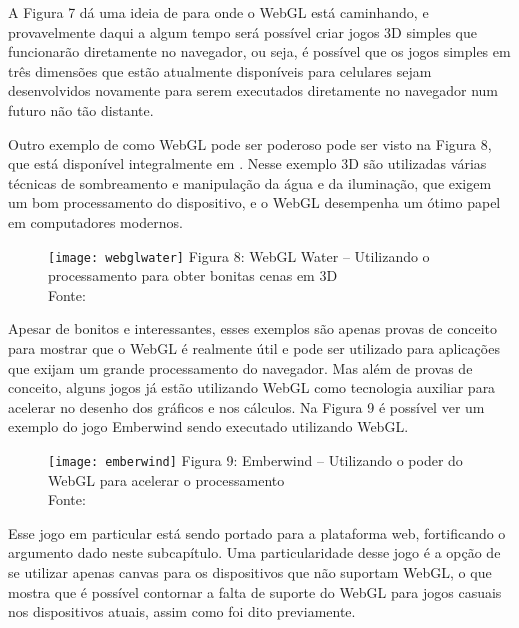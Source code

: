 A Figura 7 dá uma ideia de para onde o WebGL está
caminhando, e provavelmente daqui a algum tempo será possível criar
jogos 3D simples que funcionarão diretamente no navegador, ou seja,
é possível que os jogos simples em três dimensões que estão atualmente
disponíveis para celulares sejam desenvolvidos novamente para
serem executados diretamente no navegador num futuro não tão distante.

Outro exemplo de como WebGL pode ser poderoso pode ser visto na
Figura 8, que está disponível integralmente em .
Nesse exemplo 3D são utilizadas várias técnicas de sombreamento e
manipulação da água e da iluminação, que exigem um bom processamento
do dispositivo, e o WebGL desempenha um ótimo papel em computadores
modernos.

\begin{figure}[H]
  \centering
	\texttt{[image: webglwater]}
	\footnotesize\hspace{8\baselineskip}
	Figura 8: WebGL Water {--} Utilizando o processamento para obter bonitas cenas em 3D \\
	Fonte: \cite{website:webglwater}
  \label{img:webglwater}
\end{figure}

Apesar de bonitos e interessantes, esses exemplos são apenas provas de
conceito para mostrar que o WebGL é realmente útil e pode ser
utilizado para aplicações que exijam um grande processamento do
navegador. Mas além de provas de conceito, alguns jogos já estão
utilizando WebGL como tecnologia auxiliar para acelerar no desenho dos
gráficos e nos cálculos.
Na Figura 9 é possível ver um exemplo do jogo Emberwind
sendo executado utilizando WebGL.

\begin{figure}[H]
  \centering
	\texttt{[image: emberwind]}
	\footnotesize\hspace{8\baselineskip}
	Figura 9: Emberwind {--} Utilizando o poder do WebGL para acelerar o processamento \\
	Fonte: \cite{website:emberwind}
  \label{img:emberwind}
\end{figure}

Esse jogo em particular está sendo portado para a plataforma web,
fortificando o argumento dado neste subcapítulo. Uma particularidade
desse jogo é a opção de se utilizar apenas canvas para os dispositivos
que não suportam WebGL, o que mostra que é possível contornar a falta
de suporte do WebGL para jogos casuais nos dispositivos atuais, assim
como foi dito previamente.

\clearpage
